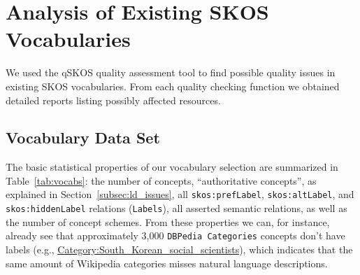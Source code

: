 
\section{Analysis of Existing SKOS Vocabularies}\label{sec:analysis}

We used the qSKOS quality assessment tool to find possible quality issues in existing SKOS vocabularies. From each quality checking function we obtained detailed reports listing possibly affected resources.

\subsection{Vocabulary Data Set}

The basic statistical properties of our vocabulary selection are summarized in Table~\ref{tab:vocabs}: the number of concepts, ``authoritative concepts'', as explained in Section~\ref{subsec:ld_issues}, all \texttt{skos:prefLabel}, \texttt{skos:altLabel}, and \texttt{skos:hiddenLabel} relations (\texttt{Labels}), all asserted semantic relations, as well as the number of concept schemes. From these properties we can, for instance, already see that approximately 3,000 \texttt{DBPedia Categories} concepts don't have labels (e.g., \url{Category:South_Korean_social_scientists}), which indicates that the same amount of Wikipedia categories misses natural language descriptions.

